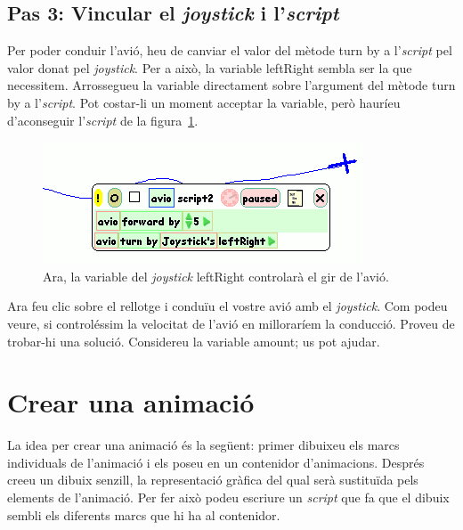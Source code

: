 \subsection{Pas 3: Vincular el \emph{joystick} i l'\emph{script}}
Per poder conduir l'avió, heu de canviar el valor del mètode \textsf{turn by} a l'\emph{script} pel valor donat pel \emph{joystick}. Per a això, la variable \textsf{leftRight} sembla ser la que necessitem. Arrossegueu la variable directament sobre l'argument del mètode \textsf{turn by} a l'\emph{script}. Pot costar-li un moment acceptar la variable, però hauríeu d'aconseguir l'\emph{script} de la figura~\ref{fig2417}.
\begin{figure}[h!]
\begin{center}
\includegraphics[scale=0.75]{Imatges/figura24-17}
\end{center}
\caption{Ara, la variable del \emph{joystick} \textsf{\upshape leftRight} controlarà el gir de l'avió.}
\label{fig2417}
\end{figure}

Ara feu clic sobre el rellotge i conduïu el vostre avió amb el \emph{joystick}. Com podeu veure, si controléssim la velocitat de l'avió en milloraríem la conducció. Proveu de trobar-hi una solució. Considereu la variable \textsf{amount}; us pot ajudar.   

\section{Crear una animació}
La idea per crear una animació és la següent: primer dibuixeu els marcs individuals de l'animació i els poseu en un contenidor d'animacions. Després creeu un dibuix senzill, la representació gràfica del qual serà sustituïda pels elements de l'animació. Per fer això podeu escriure un \emph{script} que fa que el dibuix sembli els diferents marcs que hi ha al contenidor.

